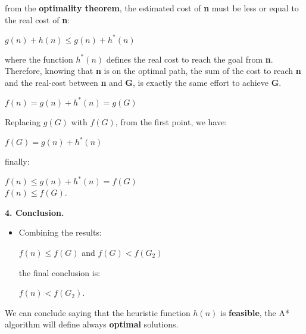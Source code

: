 \begin{example}
\begin{itemize}
        from the \textbf{optimality theorem}, the estimated cost of \textbf{n} must be less or equal to the real cost of \textbf{n}: \vspace{3.5pt}
        \begin{center}
            $g(n) + h(n) \le g(n) + h^*(n)$
        \end{center} \vspace{3.5pt}

        where the function $h^*(n)$ defines the real cost to reach the goal from \textbf{n}. Therefore, knowing that \textbf{n} is on the optimal path, the sum of the cost 
        to reach \textbf{n} and the real-cost between \textbf{n} and \textbf{G}, is exactly the same effort to achieve \textbf{G}. \vspace{3.5pt}
        \begin{center}
            $f(n) = g(n) + h^*(n) = g(G)$
        \end{center} \vspace{3.5pt}

        Replacing $g(G)$ with $f(G)$, from the first point, we have: \vspace{3.5pt}
        \begin{center}
            $f(G) = g(n) + h^*(n)$
        \end{center} \vspace{3.5pt}

        finally: \vspace{3.5pt}
        \begin{center}
            $f(n) \le g(n) + h^*(n) = f(G)$ \\
            $f(n) \le f(G)$.
        \end{center} \vspace{3.5pt}
    \end{itemize}

    \textbf{4. Conclusion.} 
    \begin{itemize}
        \renewcommand{\labelitemi}{}
        \item \vspace{3.5pt}
        Combining the results:\vspace{3.5pt}
        \begin{center}
            $f(n) \le f(G)$ and $f(G) < f(G_2)$
        \end{center} \vspace{3.5pt}

        the final conclusion is:\vspace{3.5pt}
        \begin{center}
            $f(n) < f(G_2)$.
        \end{center} 
    \end{itemize} \vspace{7pt}

    We can conclude saying that the heuristic function $h(n)$ is \textbf{feasible}, the A* algorithm will define always \textbf{optimal} solutions.  
\end{example}